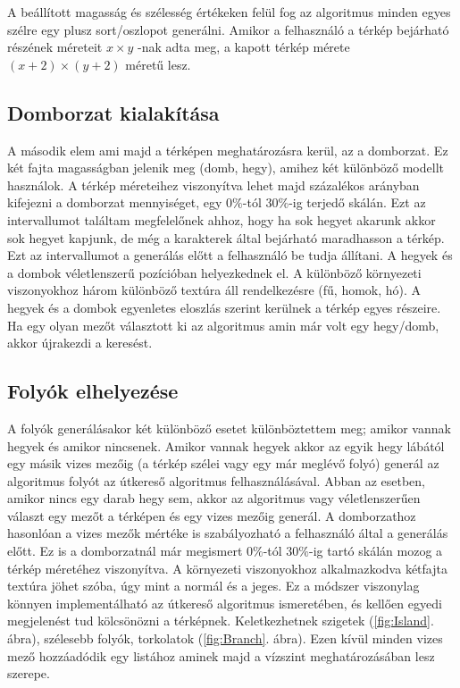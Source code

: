A beállított magasság és szélesség értékeken felül fog az algoritmus minden egyes szélre egy plusz sort/oszlopot generálni. Amikor a felhasználó a térkép bejárható részének méreteit $x \times y$ -nak adta meg, a kapott térkép mérete $(x+2) \times (y+2)$ méretű lesz.

\subsection{Domborzat kialakítása}

A második elem ami majd a térképen meghatározásra kerül, az a domborzat. Ez két fajta magasságban jelenik meg (domb, hegy), amihez két különböző modellt használok. A térkép méreteihez viszonyítva lehet majd százalékos arányban kifejezni a domborzat mennyiséget, egy $0\%$-tól $30\%$-ig terjedő skálán. Ezt az intervallumot találtam megfelelőnek ahhoz, hogy ha sok hegyet akarunk akkor sok hegyet kapjunk, de még a karakterek által bejárható maradhasson a térkép. Ezt az intervallumot a generálás előtt a felhasználó be tudja állítani. A hegyek és a dombok véletlenszerű pozícióban helyezkednek el. A különböző környezeti viszonyokhoz három különböző textúra áll rendelkezésre (fű, homok, hó). A hegyek és a dombok egyenletes eloszlás szerint kerülnek a térkép egyes részeire. Ha egy olyan mezőt választott ki az algoritmus amin már volt egy hegy/domb, akkor újrakezdi a keresést.

\subsection{Folyók elhelyezése}

A folyók generálásakor két különböző esetet különböztettem meg; amikor vannak hegyek és amikor nincsenek. Amikor vannak hegyek akkor az egyik hegy lábától egy másik vizes mezőig (a térkép szélei vagy egy már meglévő folyó) generál az algoritmus folyót az útkereső algoritmus felhasználásával. Abban az esetben, amikor nincs egy darab hegy sem, akkor az algoritmus vagy véletlenszerűen választ egy mezőt a térképen és egy vizes mezőig generál. A domborzathoz hasonlóan a vizes mezők mértéke is szabályozható a felhasználó által a generálás előtt. Ez is a domborzatnál már megismert $0\%$-tól $30\%$-ig tartó skálán mozog a térkép méretéhez viszonyítva. A környezeti viszonyokhoz alkalmazkodva kétfajta textúra jöhet szóba, úgy mint a normál és a jeges. Ez a módszer viszonylag könnyen implementálható az útkereső algoritmus ismeretében, és kellően egyedi megjelenést tud kölcsönözni a térképnek. Keletkezhetnek szigetek (\ref{fig:Island}. ábra), szélesebb folyók, torkolatok (\ref{fig:Branch}. ábra). Ezen kívül minden vizes mező hozzáadódik egy listához aminek majd a vízszint meghatározásában lesz szerepe.

